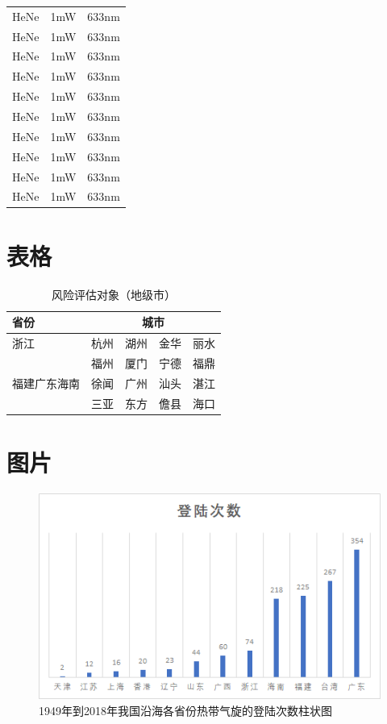 \documentclass{cumcmthesis}
\begin{document}
\begin{appendices}
\begin{longtable}[c]{p{}<{\centering}|p{}<{\centering}p{}<{\centering}}
    HeNe & 1mW & 633nm \\
    HeNe & 1mW & 633nm \\
    HeNe & 1mW & 633nm \\
    HeNe & 1mW & 633nm \\
    HeNe & 1mW & 633nm \\
    HeNe & 1mW & 633nm \\
    HeNe & 1mW & 633nm \\
    HeNe & 1mW & 633nm \\
    HeNe & 1mW & 633nm \\
    HeNe & 1mW & 633nm \\
\end{longtable}

\section{表格}
\begin{table}[htbp]
    \caption{风险评估对象（地级市）}
    \centering    
    \label{table1}
    \begin{tabular}{m{}<{\centering}|
        m{}<{\centering}m{}<{\centering}
        m{}<{\centering}m{}<{\centering}}
    \toprule[2pt]
         省份  &  \multicolumn{4}{c}{城市}  \\%
    \midrule[1pt]
        浙江  &  杭州  &  湖州  &  金华  &  丽水  \\
        \cline{1-3}
        \multirow{3}{0.1\textwidth}{福建广东海南}
        &  福州  &  厦门  &  宁德  &  福鼎  \\
        &  徐闻  &  广州  &  汕头  \vline&  湛江  \\
        &  三亚  &  东方  &  儋县  &  海口  \\
    \bottomrule[1.5pt]
    \end{tabular}
\end{table}

\section{图片}
\begin{figure}[!h]
    \centering
    \includegraphics[width=.6\textwidth]{1949-2018_province_occurence.png}
    \caption{1949年到2018年我国沿海各省份热带气旋的登陆次数柱状图}
    \label{figure1}
\end{figure}



\end{appendices}
\end{document}
